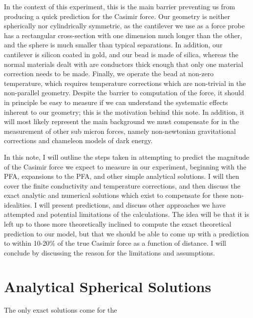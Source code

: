 \documentclass[11pt]{article}
\begin{document}
In the context of this experiment, this is the main barrier preventing us from producing a quick prediction for the Casimir force. Our geometry is neither spherically nor cylindrically symmetric, as the cantilever we use as a force probe has a rectangular cross-section with one dimension much longer than the other, and the sphere is much smaller than typical separations. In addition, our cantilever is silicon coated in gold, and our bead is made of silica, whereas the normal materials dealt with are conductors thick enough that only one material correction needs to be made. Finally, we operate the bead at non-zero temperature, which requires temperature corrections which are non-trivial in the non-parallel geometry. Despite the barrier to computation of the force, it should in principle be easy to measure if we can understand the systematic effects inherent to our geometry; this is the motivation behind this note. In addition, it will most likely represent the main background we must compensate for in the measurement of other sub micron forces, namely non-newtonian gravitational corrections and chameleon models of dark energy.

In this note, I will outline the steps taken in attempting to predict the magnitude of the Casimir force we expect to measure in our experiment, beginning with the PFA, expansions to the PFA, and other simple analytical solutions. I will then cover the finite conductivity and temperature corrections, and then discuss the exact analytic and numerical solutions which exist to compensate for these non-idealities. I will present predictions, and discuss other approaches we have attempted and potential limitations of the calculations. The idea will be that it is left up to those more theoretically inclined to compute the exact theoretical prediction to our model, but that we should be able to come up with a prediction to within 10-20\% of the true Casimir force as a function of distance. I will conclude by discussing the reason for the limitations and assumptions.

\section{Analytical Spherical Solutions}

The only exact solutions come for the 
\end{document}
